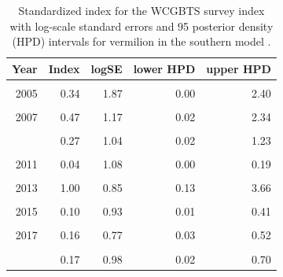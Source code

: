 \documentclass[
  english,
  a4paper,
]{article}
\begin{document}
\begin{table}

\caption{\label{tab:tab-index-wcgbts}Standardized index for the WCGBTS survey index with log-scale standard errors and 95%
       posterior density (HPD) intervals for vermilion in the southern model .}
\centering
\begin{tabular}[t]{rrrrr}
\toprule
Year & Index & logSE & lower HPD & upper HPD\\
\midrule
\cellcolor{gray!6}{2003} & \cellcolor{gray!6}{0.78} & \cellcolor{gray!6}{1.26} & \cellcolor{gray!6}{0.03} & \cellcolor{gray!6}{4.10}\\
2005 & 0.34 & 1.87 & 0.00 & 2.40\\
\cellcolor{gray!6}{2006} & \cellcolor{gray!6}{0.13} & \cellcolor{gray!6}{1.16} & \cellcolor{gray!6}{0.01} & \cellcolor{gray!6}{0.62}\\
2007 & 0.47 & 1.17 & 0.02 & 2.34\\
\cellcolor{gray!6}{2008} & \cellcolor{gray!6}{0.83} & \cellcolor{gray!6}{1.01} & \cellcolor{gray!6}{0.07} & \cellcolor{gray!6}{3.58}\\
\addlinespace
2009 & 0.27 & 1.04 & 0.02 & 1.23\\
\cellcolor{gray!6}{2010} & \cellcolor{gray!6}{0.19} & \cellcolor{gray!6}{1.01} & \cellcolor{gray!6}{0.02} & \cellcolor{gray!6}{0.79}\\
2011 & 0.04 & 1.08 & 0.00 & 0.19\\
\cellcolor{gray!6}{2012} & \cellcolor{gray!6}{1.81} & \cellcolor{gray!6}{1.46} & \cellcolor{gray!6}{0.04} & \cellcolor{gray!6}{10.72}\\
2013 & 1.00 & 0.85 & 0.13 & 3.66\\
\addlinespace
\cellcolor{gray!6}{2014} & \cellcolor{gray!6}{3.72} & \cellcolor{gray!6}{1.01} & \cellcolor{gray!6}{0.30} & \cellcolor{gray!6}{16.34}\\
2015 & 0.10 & 0.93 & 0.01 & 0.41\\
\cellcolor{gray!6}{2016} & \cellcolor{gray!6}{0.22} & \cellcolor{gray!6}{0.88} & \cellcolor{gray!6}{0.03} & \cellcolor{gray!6}{0.82}\\
2017 & 0.16 & 0.77 & 0.03 & 0.52\\
\cellcolor{gray!6}{2018} & \cellcolor{gray!6}{0.61} & \cellcolor{gray!6}{0.91} & \cellcolor{gray!6}{0.07} & \cellcolor{gray!6}{2.34}\\
\addlinespace
2019 & 0.17 & 0.98 & 0.02 & 0.70\\
\bottomrule
\end{tabular}
\end{table}
\end{document}
